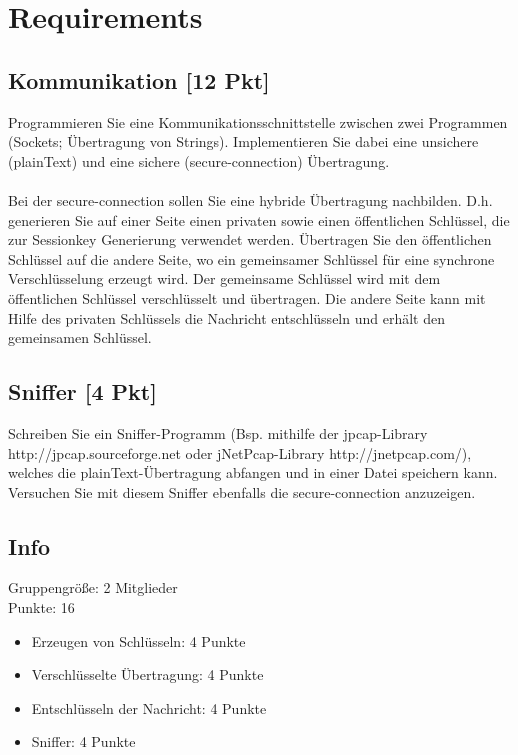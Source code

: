 \documentclass[11pt, a4paper]{article}
\begin{document}
\section{Requirements}

\subsection{Kommunikation [12 Pkt]}

Programmieren Sie eine Kommunikationsschnittstelle zwischen zwei Programmen (Sockets; Übertragung von Strings). Implementieren Sie dabei eine unsichere (plainText) und eine sichere (secure-connection) Übertragung.
\\\\
Bei der secure-connection sollen Sie eine hybride Übertragung nachbilden. D.h. generieren Sie auf einer Seite einen privaten sowie einen öffentlichen Schlüssel, die zur Sessionkey Generierung verwendet werden. Übertragen Sie den öffentlichen Schlüssel auf die andere Seite, wo ein gemeinsamer Schlüssel für eine synchrone Verschlüsselung erzeugt wird. Der gemeinsame Schlüssel wird mit dem öffentlichen Schlüssel verschlüsselt und übertragen. Die andere Seite kann mit Hilfe des privaten Schlüssels die Nachricht entschlüsseln und erhält den gemeinsamen Schlüssel.

\subsection{Sniffer [4 Pkt]}

Schreiben Sie ein Sniffer-Programm (Bsp. mithilfe der jpcap-Library http://jpcap.sourceforge.net oder jNetPcap-Library http://jnetpcap.com/), welches die plainText-Übertragung abfangen und in einer Datei speichern kann. Versuchen Sie mit diesem Sniffer ebenfalls die secure-connection anzuzeigen.

\subsection{Info}

Gruppengröße: 2 Mitglieder \\
Punkte: 16

\begin{itemize}
	\item Erzeugen von Schlüsseln: 4 Punkte
	\item Verschlüsselte Übertragung: 4 Punkte
	\item Entschlüsseln der Nachricht: 4 Punkte
	\item Sniffer: 4 Punkte
\end{itemize}
\end{document}
